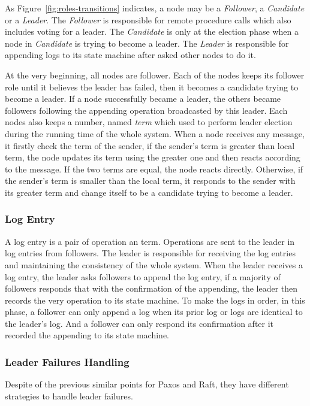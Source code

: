 \documentclass[12pt, a4paper]{article}
\begin{document}
As Figure~\ref{fig:roles-transitions} indicates, a node may be a \textit{Follower}, a \textit{Candidate} or a \textit{Leader}. The \textit{Follower} is responsible for remote procedure calls which also includes voting for a leader. The \textit{Candidate} is only at the election phase when a node in \textit{Candidate} is trying to become a leader. The \textit{Leader} is responsible for appending logs to its state machine after asked other nodes to do it.

At the very beginning, all nodes are follower. Each of the nodes keeps its follower role until it believes the leader has failed, then it becomes a candidate trying to become a leader. If a node successfully became a leader, the others became followers following the appending operation broadcasted by this leader. Each nodes also keeps a number, named \textit{term} which used to perform leader election during the running time of the whole system. When a node receives any message, it firstly check the term of the sender, if the sender's term is greater than local term, the node updates its term using the greater one and then reacts according to the message. If the two terms are equal, the node reacts directly. Otherwise, if the sender's term is smaller than the local term, it responds to the sender with its greater term and change itself to be a candidate trying to become a leader.

\subsubsection{Log Entry}
A log entry is a pair of operation an term. Operations are sent to the leader in log entries from followers. The leader is responsible for receiving the log entries and maintaining the consistency of the whole system. When the leader receives a log entry, the leader asks followers to append the log entry, if a majority of followers responds that with the confirmation of the appending, the leader then records the very operation to its state machine. To make the logs in order, in this phase, a follower can only append a log when its prior log or logs are identical to the leader's log. And a follower can only respond its confirmation after it recorded the appending to its state machine.

\subsubsection{Leader Failures Handling}
Despite of the previous similar points for Paxos and Raft, they have different strategies to handle leader failures.
\end{document}

